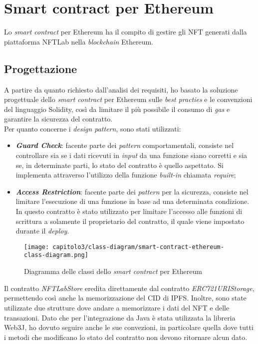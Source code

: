 
\section{Smart contract per Ethereum}
Lo \textit{smart contract} per Ethereum ha il compito di gestire gli NFT generati dalla piattaforma NFTLab nella \textit{blockchain} Ethereum.

\subsection{Progettazione}
A partire da quanto richiesto dall'analisi dei requisiti, ho basato la soluzione progettuale dello \textit{smart contract} per Ethereum sulle \textit{best practies} e le convenzioni del linguaggio Solidity, così da limitare il più possibile il consumo di \textit{gas} e garantire la sicurezza del contratto. \\

\noindent Per quanto concerne i \textit{design pattern}, sono stati utilizzati:
\begin{itemize}
  \item \textbf{\textit{Guard Check}}: facente parte dei \textit{pattern} comportamentali, consiste nel controllare sia se i dati ricevuti in \textit{input} da una funzione siano corretti e sia se, in determinate parti, lo stato del contratto è quello aspettato. Si implementa attraverso l'utilizzo della funzione \textit{built-in} chiamata \textit{require};
  \item \textbf{\textit{Access Restriction}}: facente parte dei \textit{pattern} per la sicurezza, consiste nel limitare l'esecuzione di una funzione in base ad una determinata condizione. In questo contratto è stato utilizzato per limitare l'accesso alle funzioni di scrittura a solamente il proprietario del contratto, il quale viene impostato durante il \textit{deploy}.
\end{itemize}

\clearpage

\begin{figure}[h!]
  \centering
  \texttt{[image: capitolo3/class-diagram/smart-contract-ethereum-class-diagram.png]}
  \caption{Diagramma delle classi dello \textit{smart contract} per Ethereum}
\end{figure}

Il contratto \textit{NFTLabStore} eredita direttamente dal contratto \textit{ERC721URIStorage}, permettendo così anche la memorizzazione del CID di IPFS. Inoltre, sono state utilizzate due strutture dove andare a memorizzare i dati del NFT e delle transazioni. Dato che per l'integrazione da Java è stata utilizzata la libreria Web3J, ho dovuto seguire anche le sue convezioni, in particolare quella dove tutti i metodi che modificano lo stato del contratto non devono ritornare alcun dato.

